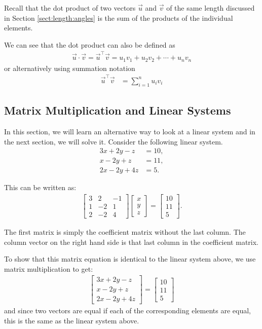 Recall that the dot product of two vectors $\vec{u}$ and $\vec{v}$ of the same length discussed in Section \ref{sect:length:angles} is the sum of the products of the individual elements.

 We can see that the dot product can also be defined as
%
\begin{align*}
\vec{u} \cdot \vec{v} = \vec{u}^{\intercal} \vec{v} = u_1 v_1 + u_2 v_2 + \cdots + u_n v_n
\end{align*}
or alternatively using summation notation
%
\begin{align*}
\vec{u}^{\intercal} \vec{v} & = \sum_{i=1}^n u_i v_i
\end{align*}


\subsection{Matrix Multiplication and Linear Systems}
\label{section:matrix:multiplication:linear:systems}

In this section, we will learn an alternative way to look at a linear system and in the next section, we will solve it.  Consider the following linear system.
%
\begin{align*}
3 x + 2y - z & = 10, \\
 x - 2y + z & = 11, \\
 2x - 2y + 4z & = 5.
\end{align*}

This can be written as:
%
\begin{align*}
\begin{bmatrix}
3 & 2 & -1 \\ 1 & -2 & 1 \\ 2 & -2 & 4
\end{bmatrix} \begin{bmatrix}
x \\ y \\ z
\end{bmatrix} = \begin{bmatrix}
10 \\ 11 \\ 5
\end{bmatrix}.
\end{align*}

The first matrix is simply the coefficient matrix without the last column.  The column vector on the right hand side is that last column in the coefficient matrix.

To show that this matrix equation is identical to the linear system above, we use matrix multiplication to get:
\begin{align*}
\begin{bmatrix}
	3x +2y -z \\ x-2y+z \\ 2x-2y + 4z
\end{bmatrix} =
\begin{bmatrix}
	10 \\ 11 \\ 5
\end{bmatrix}
\end{align*}
and since two vectors are equal if each of the corresponding elements are equal, this is the same as the linear system above.

